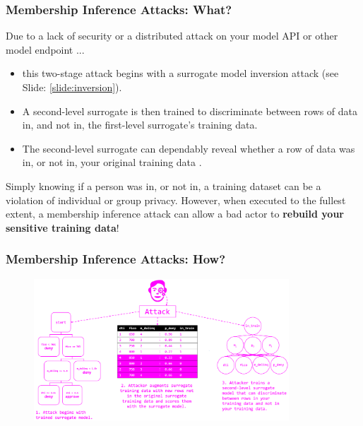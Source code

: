 \documentclass[11pt,
               aspectratio=169,
               hyperref={colorlinks}
               ]{beamer}
\begin{document}
			\begin{frame}
		
				\frametitle{Membership Inference Attacks: \textbf{What?}}		
				\small Due to a lack of security or a distributed attack on your model API or other model endpoint ... 
			
				\begin{itemize}
					\item this two-stage attack begins with a surrogate model inversion attack (see Slide: \ref{slide:inversion}).
					\item A second-level surrogate is then trained to discriminate between rows of data in, and not in, the first-level surrogate's training data.
					\item The second-level surrogate can dependably reveal whether a row of data was in, or not in, your original training data \cite{membership_inference}.
				\end{itemize}
				
Simply knowing if a person was in, or not in, a training dataset can be a violation of individual or group privacy. However, when executed to the fullest extent, a membership inference attack can allow a bad actor to \textbf{rebuild your sensitive training data}!\normalsize	

			\end{frame}
	
			\begin{frame}[label={slide:membership}]
		
				\frametitle{Membership Inference Attacks: \textbf{How?}}		
			
				\begin{figure}[htb]
					\begin{center}
						\includegraphics[height=150pt]{img/membership.PNG}
					\end{center}
				\end{figure}	

			\end{frame}
			
\end{document}
